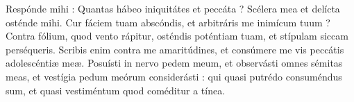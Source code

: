 \lettrine{R}{}espónde mihi :
Quantas hábeo iniquitátes et peccáta ? Scélera mea et delícta osténde mihi.
Cur fáciem tuam abscóndis, et arbitráris me inimícum tuum ?
Contra fólium, quod vento rápitur, osténdis poténtiam tuam, et stípulam siccam perséqueris.
Scribis enim contra me amaritúdines, et consúmere me vis peccátis adolescéntiæ meæ.
Posuísti in nervo pedem meum, et observásti omnes sémitas meas, et vestígia pedum meórum considerásti :
qui quasi putrédo consuméndus sum, et quasi vestiméntum quod coméditur a tínea.
